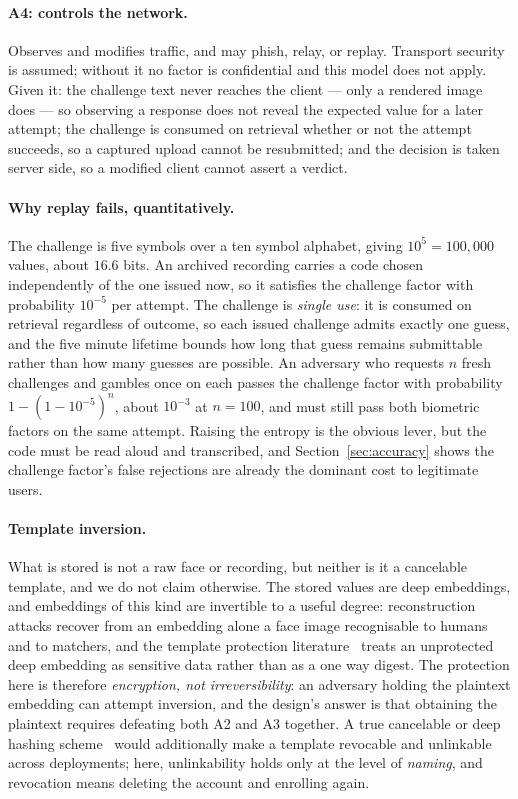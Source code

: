 \documentclass[runningheads]{llncs}
\providecommand{\AttackChallengeSpace}{100{,}000}
\begin{document}
{\paragraph{A4: controls the network.} Observes and modifies traffic, and may phish, relay, or replay. Transport security is assumed; without it no factor is confidential and this model does not apply. Given it: the challenge text never reaches the client --- only a rendered image does --- so observing a response does not reveal the expected value for a later attempt; the challenge is consumed on retrieval whether or not the attempt succeeds, so a captured upload cannot be resubmitted; and the decision is taken server side, so a modified client cannot assert a verdict.

\paragraph{Why replay fails, quantitatively.} The challenge is five symbols over a ten symbol alphabet, giving $10^{5}=\AttackChallengeSpace$ values, about $16.6$ bits. An archived recording carries a code chosen independently of the one issued now, so it satisfies the challenge factor with probability $10^{-5}$ per attempt. The challenge is \emph{single use}: it is consumed on retrieval regardless of outcome, so each issued challenge admits exactly one guess, and the five minute lifetime bounds how long that guess remains submittable rather than how many guesses are possible. An adversary who requests $n$ fresh challenges and gambles once on each passes the challenge factor with probability $1-(1-10^{-5})^{n}$, about $10^{-3}$ at $n=100$, and must still pass both biometric factors on the same attempt. Raising the entropy is the obvious lever, but the code must be read aloud and transcribed, and Section~\ref{sec:accuracy} shows the challenge factor's false rejections are already the dominant cost to legitimate users.

\paragraph{Template inversion.} What is stored is not a raw face or recording, but neither is it a cancelable template, and we do not claim otherwise. The stored values are deep embeddings, and embeddings of this kind are invertible to a useful degree: reconstruction attacks recover from an embedding alone a face image recognisable to humans and to matchers, and the template protection literature~\cite{rathgeb2023btp,zhao2023deephash} treats an unprotected deep embedding as sensitive data rather than as a one way digest. The protection here is therefore \emph{encryption, not irreversibility}: an adversary holding the plaintext embedding can attempt inversion, and the design's answer is that obtaining the plaintext requires defeating both A2 and A3 together. A true cancelable or deep hashing scheme~\cite{zhao2023deephash} would additionally make a template revocable and unlinkable across deployments; here, unlinkability holds only at the level of \emph{naming}, and revocation means deleting the account and enrolling again.

}
\end{document}

